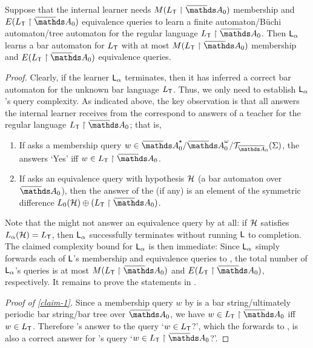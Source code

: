 \documentclass[a4paper,UKenglish,cleveref,autoref,thm-restate,numberwithinsect,final]{lipics-v2021}
\begin{document}
    \begin{theorem}[Correctness]\label{lem:correctEverything}%
      Suppose that the internal learner
      \learn needs ${M(L_\teach\restriction \barNames_0)}$ membership and $E(L_\teach\restriction \barNames_0)$ equivalence queries to learn a finite automaton/Büchi automaton/tree automaton for the regular language
      $L_\teach \restriction \barNames_0$. Then $\textsf{L}_\alpha$ learns a
      bar automaton for $L_\textsf{T}$ with at most $M(L_\teach \restriction \barNames_0)$ membership and $E(L_\teach\restriction \barNames_0)$ equivalence
      queries.
    \end{theorem}
    \begin{proof}
Clearly, if the learner $\textsf{L}_\alpha$ terminates, then it has inferred a correct bar automaton for the unknown bar language $L_\textsf{T}$. Thus, we only need to establish $\textsf{L}_\alpha$'s query complexity. As indicated above, the key observation is that all answers the internal learner \learn receives from the \tass correspond to answers of a teacher for the regular language $L_\teach\restriction \barNames_0$; that is,
\begin{enumerate}
\item\label{claim-1} If \learn asks a membership query $w\in
  \barAs_0/\barAw_0/\bartree[\barNamess_0](\Sigma)$, %
  the \tass answers `Yes' iff $w\in L_\teach\restriction \barNames_0$.
\item\label{claim-2} If \learn asks an equivalence query with hypothesis $\mathcal{H}$ (a bar automaton
  over $\barNames_0$), then the answer of the \tass (if any) is an element of the symmetric difference $L_0(\H) \oplus (L_\teach\restriction \barNames_0)$. 
\end{enumerate}
Note that the \tass might not answer an equivalence query by \learn at all: if $\mathcal{H}$ satisfies
$L_\alpha(\mathcal{H})=L_\textsf{T}$, then $\textsf{L}_\alpha$ successfully terminates without running $\textsf{L}$
to completion. The claimed complexity bound for $\textsf{L}_\alpha$ is then immediate: Since
$\textsf{L}_\alpha$ simply forwards each of $\textsf{L}$'s membership and equivalence queries to
\teach, the total number of $\textsf{L}_\alpha$'s queries is at most $M(L_\teach\restriction
\barNames_0)$ and $E(L_\teach\restriction \barNames_0)$, respectively. It remains to prove the
statements in .

\smallskip\noindent
\emph{Proof of \cref{claim-1}.} Since a membership query $w$ by \learn is a bar string/ultimately periodic bar string/bar tree over $\barNames_0$, we have $w\in L_\teach\restriction \barNames_0$ iff $w\in L_\textsf{T}$. Therefore \teach's answer to the query `$w\in L_\textsf{T}$?', which the \tass forwards to \learn, is also a correct answer for \learn's query `$w\in L_\teach\restriction \barNames_0$?'.      


\end{proof}
\end{document}
